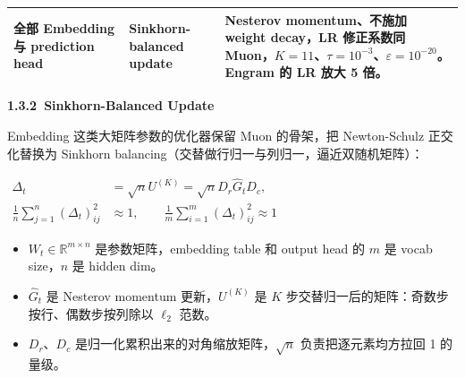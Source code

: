 \documentclass[zihao=false,fontset=windows]{ctexart}
\newcommand{\bigmath}[1]{%
  \begin{center}\large$\displaystyle #1$\end{center}%
}
\begin{document}
\begin{longtable}{|>{\raggedright\arraybackslash}p{4.6cm}|>{\raggedright\arraybackslash}p{4.6cm}|>{\raggedright\arraybackslash}p{4.6cm}|}
\textbf{全部 Embedding 与 prediction head}\par
 & 
\textbf{Sinkhorn-balanced update}\par
 & 
Nesterov momentum、不施加 weight decay，LR 修正系数同 Muon，$K=11$、$\tau=10^{-3}$、$\varepsilon=10^{-20}$。Engram 的 LR 放大 5 倍。\par
 \\ \hline
\end{longtable}

\par{}\vspace{0.8em}\noindent \begin{tcolorbox}[boxrule=0pt,arc=3pt,colback=callGreen,left=3pt,right=3pt,top=2pt,bottom=2pt,before skip=0pt,after skip=0pt]{\bfseries \textcolor{feishuBlue}{1.3.2}\ Sinkhorn-Balanced Update}\end{tcolorbox}\par\vspace{0.28em}

Embedding 这类大矩阵参数的优化器保留 Muon 的骨架，把 Newton-Schulz 正交化替换为 Sinkhorn balancing（交替做行归一与列归一，逼近双随机矩阵）：\par

\bigmath{\begin{aligned}\Delta_t&=\sqrt{n}U^{(K)}=\sqrt{n}D_r\widehat{G}_tD_c,\\ \frac{1}{n}\sum_{j=1}^{n}(\Delta_t)_{ij}^{2}&\approx1,\qquad \frac{1}{m}\sum_{i=1}^{m}(\Delta_t)_{ij}^{2}\approx1\end{aligned}}
\begin{itemize}
\item 
$W_t\in\mathbb{R}^{m\times n}$ 是参数矩阵，embedding table 和 output head 的 $m$ 是 vocab size，$n$ 是 hidden dim。\par
\item 
$\widehat{G}_t$ 是 Nesterov momentum 更新，$U^{(K)}$ 是 $K$ 步交替归一后的矩阵：奇数步按行、偶数步按列除以 $\ell_2$ 范数。\par
\item 
$D_r$、$D_c$ 是归一化累积出来的对角缩放矩阵，$\sqrt{n}$ 负责把逐元素均方拉回 1 的量级。\par
\end{itemize}
\end{document}
